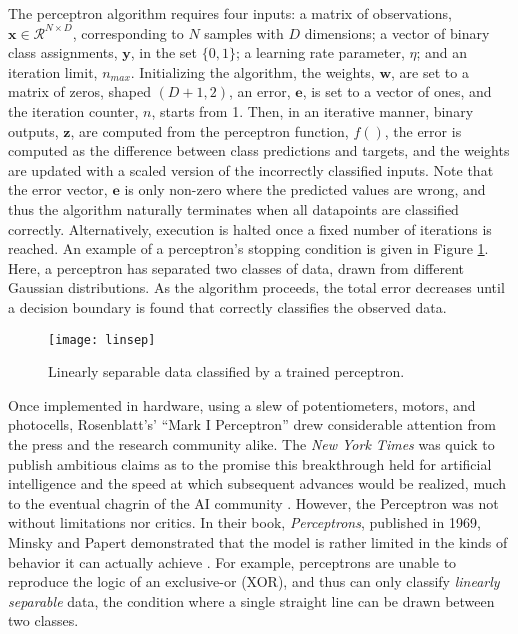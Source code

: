 \noindent The perceptron algorithm requires four inputs:
a matrix of observations, $\mathbf{x} \in \mathcal{R}^{N\times D}$, corresponding to $N$ samples with $D$ dimensions;
a vector of binary class assignments, $\mathbf{y}$, in the set $\{0, 1\}$;
a learning rate parameter, $\eta$;
and an iteration limit, $n_{max}$.
Initializing the algorithm, the weights, $\mathbf{w}$, are set to a matrix of zeros, shaped $(D + 1, 2)$, an error, $\mathbf{e}$, is set to a vector of ones, and the iteration counter, $n$, starts from 1.
Then, in an iterative manner, binary outputs, $\mathbf{z}$, are computed from the perceptron function, $f()$,
the error is computed as the difference between class predictions and targets, and the weights are updated with a scaled version of the incorrectly classified inputs.
Note that the error vector, $\mathbf{e}$ is only non-zero where the predicted values are wrong, and thus the algorithm naturally terminates when all datapoints are classified correctly.
Alternatively, execution is halted once a fixed number of iterations is reached.
An example of a perceptron's stopping condition is given in Figure \ref{fig:linsep}.
Here, a perceptron has separated two classes of data, drawn from different Gaussian distributions.
As the algorithm proceeds, the total error decreases until a decision boundary is found that correctly classifies the observed data.

\begin{figure}
\begin{centering}
\texttt{[image: linsep]}
\caption{Linearly separable data classified by a trained perceptron.}
\label{fig:linsep}
\end{centering}
\end{figure}

Once implemented in hardware, using a slew of potentiometers, motors, and photocells, Rosenblatt's' ``Mark I Perceptron'' drew considerable attention from the press and the research community alike.
The \emph{New York Times} was quick to publish ambitious claims as to the promise this breakthrough held for artificial intelligence and the speed at which subsequent advances would be realized, much to the eventual chagrin of the AI community \cite{Olazaran1996Sociological}.
However, the Perceptron was not without limitations nor critics.
In their book, \emph{Perceptrons}, published in 1969, Minsky and Papert demonstrated that the model is rather limited in the kinds of behavior it can actually achieve \cite{Minsky1969Perceptrons}.
For example, perceptrons are unable to reproduce the logic of an exclusive-or (XOR), and thus can only classify \emph{linearly separable} data, the condition where a single straight line can be drawn between two classes.

